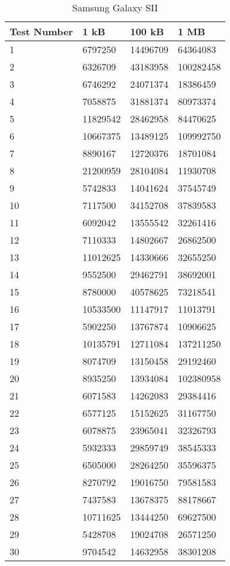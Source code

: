 	\begin{table}[ht!]
    		\caption{Samsung Galaxy SII} \label{tab:distamceGoogleGlassFull}
		\centering \begin{tabularx}{\textwidth}{l|X|X|X} \hline
		Test Number & \textbf{1 kB} & \textbf{100 kB} & \textbf{1 MB} \\ \hline \hline
       
		1&	6797250	&	14496709	&	64364083		\\ \hline
		2&	6326709	&	43183958	&	100282458	\\ \hline
		3&	6746292	&	24071374	&	18386459		\\ \hline
		4&	7058875	&	31881374	&	80973374		\\ \hline
		5&	11829542	&	28462958	&	84470625		\\ \hline
		6&	10667375	&	13489125	&	109992750	\\ \hline
		7&	8890167	&	12720376	&	18701084		\\ \hline
		8&	21200959	&	28104084	&	11930708		\\ \hline
		9&	5742833	&	14041624	&	37545749		\\ \hline
		10&	7117500	&	34152708	&	37839583		\\ \hline
		11&	6092042	&	13555542	&	32261416		\\ \hline
		12&	7110333	&	14802667	&	26862500		\\ \hline
		13&	11012625	&	14330666	&	32655250		\\ \hline
		14&	9552500	&	29462791	&	38692001		\\ \hline
		15&	8780000	&	40578625	&	73218541		\\ \hline
		16&	10533500	&	11147917	&	11013791		\\ \hline
		17&	5902250	&	13767874	&	10906625		\\ \hline
		18&	10135791	&	12711084	&	137211250	\\ \hline
		19&	8074709	&	13150458	&	29192460		\\ \hline
		20&	8935250	&	13934084	&	102380958	\\ \hline
		21&	6071583	&	14262083	&	29384416		\\ \hline
		22&	6577125	&	15152625	&	31167750		\\ \hline
		23&	6078875	&	23965041	&	32326793		\\ \hline
		24&	5932333	&	29859749	&	38545333		\\ \hline
		25&	6505000	&	28264250	&	35596375		\\ \hline
		26&	8270792	&	19016750	&	79581583		\\ \hline
		27&	7437583	&	13678375	&	88178667		\\ \hline
		28&	10711625	&	13444250	&	69627500		\\ \hline
		29&	5428708	&	19024708	&	26571250		\\ \hline
		30&	9704542	&	14632958	&	38301208		\\ \hline

		\end{tabularx}
	\end{table}
	
